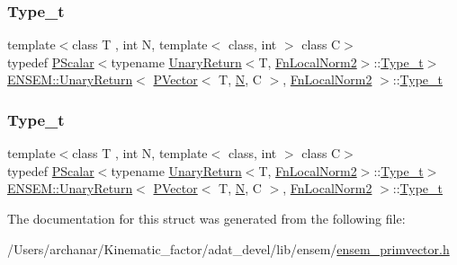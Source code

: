 \subsubsection{\texorpdfstring{Type\_t}{Type\_t}\hspace{0.1cm}{\footnotesize\ttfamily [1/2]}}
{\footnotesize\ttfamily template$<$class T , int N, template$<$ class, int $>$ class C$>$ \\
typedef \mbox{\hyperlink{classENSEM_1_1PScalar}{P\+Scalar}}$<$typename \mbox{\hyperlink{structENSEM_1_1UnaryReturn}{Unary\+Return}}$<$T, \mbox{\hyperlink{structENSEM_1_1FnLocalNorm2}{Fn\+Local\+Norm2}}$>$\+::\mbox{\hyperlink{structENSEM_1_1UnaryReturn_3_01PVector_3_01T_00_01N_00_01C_01_4_00_01FnLocalNorm2_01_4_a80720f6a92790f2897bfe4bc434f64d8}{Type\+\_\+t}}$>$ \mbox{\hyperlink{structENSEM_1_1UnaryReturn}{E\+N\+S\+E\+M\+::\+Unary\+Return}}$<$ \mbox{\hyperlink{classENSEM_1_1PVector}{P\+Vector}}$<$ T, \mbox{\hyperlink{operator__name__util_8cc_a7722c8ecbb62d99aee7ce68b1752f337}{N}}, C $>$, \mbox{\hyperlink{structENSEM_1_1FnLocalNorm2}{Fn\+Local\+Norm2}} $>$\+::\mbox{\hyperlink{structENSEM_1_1UnaryReturn_3_01PVector_3_01T_00_01N_00_01C_01_4_00_01FnLocalNorm2_01_4_a80720f6a92790f2897bfe4bc434f64d8}{Type\+\_\+t}}}

\mbox{\label{structENSEM_1_1UnaryReturn_3_01PVector_3_01T_00_01N_00_01C_01_4_00_01FnLocalNorm2_01_4_a80720f6a92790f2897bfe4bc434f64d8}} 
\subsubsection{\texorpdfstring{Type\_t}{Type\_t}\hspace{0.1cm}{\footnotesize\ttfamily [2/2]}}
{\footnotesize\ttfamily template$<$class T , int N, template$<$ class, int $>$ class C$>$ \\
typedef \mbox{\hyperlink{classENSEM_1_1PScalar}{P\+Scalar}}$<$typename \mbox{\hyperlink{structENSEM_1_1UnaryReturn}{Unary\+Return}}$<$T, \mbox{\hyperlink{structENSEM_1_1FnLocalNorm2}{Fn\+Local\+Norm2}}$>$\+::\mbox{\hyperlink{structENSEM_1_1UnaryReturn_3_01PVector_3_01T_00_01N_00_01C_01_4_00_01FnLocalNorm2_01_4_a80720f6a92790f2897bfe4bc434f64d8}{Type\+\_\+t}}$>$ \mbox{\hyperlink{structENSEM_1_1UnaryReturn}{E\+N\+S\+E\+M\+::\+Unary\+Return}}$<$ \mbox{\hyperlink{classENSEM_1_1PVector}{P\+Vector}}$<$ T, \mbox{\hyperlink{operator__name__util_8cc_a7722c8ecbb62d99aee7ce68b1752f337}{N}}, C $>$, \mbox{\hyperlink{structENSEM_1_1FnLocalNorm2}{Fn\+Local\+Norm2}} $>$\+::\mbox{\hyperlink{structENSEM_1_1UnaryReturn_3_01PVector_3_01T_00_01N_00_01C_01_4_00_01FnLocalNorm2_01_4_a80720f6a92790f2897bfe4bc434f64d8}{Type\+\_\+t}}}



The documentation for this struct was generated from the following file\+:\begin{DoxyCompactItemize}
\item 
/\+Users/archanar/\+Kinematic\+\_\+factor/adat\+\_\+devel/lib/ensem/\mbox{\hyperlink{lib_2ensem_2ensem__primvector_8h}{ensem\+\_\+primvector.\+h}}\end{DoxyCompactItemize}

